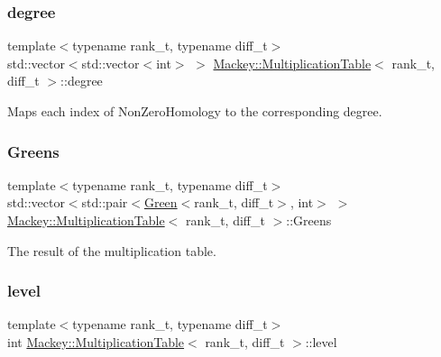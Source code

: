 \subsubsection{\texorpdfstring{degree}{degree}}
{\footnotesize\ttfamily template$<$typename rank\+\_\+t, typename diff\+\_\+t$>$ \\
std\+::vector$<$std\+::vector$<$int$>$ $>$ \hyperlink{classMackey_1_1MultiplicationTable}{Mackey\+::\+Multiplication\+Table}$<$ rank\+\_\+t, diff\+\_\+t $>$\+::degree\hspace{0.3cm}{\ttfamily [protected]}}



Maps each index of Non\+Zero\+Homology to the corresponding degree. 

\mbox{\label{classMackey_1_1MultiplicationTable_a045f3f5912a6fe634b1763367725f81f}} 
\subsubsection{\texorpdfstring{Greens}{Greens}}
{\footnotesize\ttfamily template$<$typename rank\+\_\+t, typename diff\+\_\+t$>$ \\
std\+::vector$<$std\+::pair$<$\hyperlink{classMackey_1_1Green}{Green}$<$rank\+\_\+t, diff\+\_\+t$>$, int$>$ $>$ \hyperlink{classMackey_1_1MultiplicationTable}{Mackey\+::\+Multiplication\+Table}$<$ rank\+\_\+t, diff\+\_\+t $>$\+::Greens\hspace{0.3cm}{\ttfamily [protected]}}



The result of the multiplication table. 

\mbox{\label{classMackey_1_1MultiplicationTable_ad5a05c126e0b3c769fa9b1196a8db96a}} 
\subsubsection{\texorpdfstring{level}{level}}
{\footnotesize\ttfamily template$<$typename rank\+\_\+t, typename diff\+\_\+t$>$ \\
int \hyperlink{classMackey_1_1MultiplicationTable}{Mackey\+::\+Multiplication\+Table}$<$ rank\+\_\+t, diff\+\_\+t $>$\+::level}



